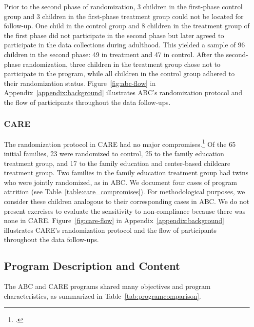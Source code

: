 \noindent Prior to the second phase of randomization, 3 children in the first-phase control group and 3 children in the first-phase treatment group could not be located for follow-up. One child in the control group and 8 children in the treatment group of the first phase did not participate in the second phase but later agreed to participate in the data collections during adulthood. This yielded a sample of 96 children in the second phase: 49 in treatment and 47 in control. After the second-phase randomization, three children in the treatment group chose not to participate in the program, while all children in the control group adhered to their randomization status. Figure~\ref{fig:abc-flow} in Appendix~\ref{appendix:background} illustrates ABC's randomization protocol and the flow of participants throughout the data follow-ups.\\

\subsubsection{CARE}

\noindent The randomization protocol in CARE had no major compromises.\footnote{\citet{Bryant1987TIECSE,Wasik_Ramey_etal_1990_CD,Burchinal_Campbell_etal_1997_CD}.} Of the 65 initial families, 23 were randomized to control, 25 to the family education treatment group, and 17 to the family education and center-based childcare treatment group. Two families in the family education treatment group had twins who were jointly randomized, as in ABC. We document four cases of program attrition (see Table~\ref{table:care_compromises}). For methodological purposes, we consider these children analogous to their corresponding cases in ABC. We do not present exercises to evaluate the sensitivity to non-compliance because there was none in CARE. Figure~\ref{fig:care-flow} in Appendix~\ref{appendix:background} illustrates CARE's randomization protocol and the flow of participants throughout the data follow-ups.\\



\subsection{Program Description and Content}

\noindent The ABC and CARE programs shared many objectives and program characteristics, as summarized in Table~\ref{tab:programcomparison}.\\

